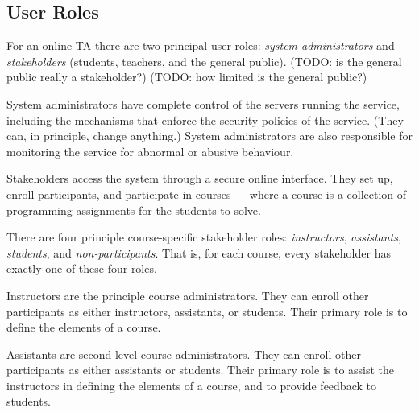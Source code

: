 
\subsection{User Roles}


For an online TA there are two principal user roles: \emph{system
administrators} and \emph{stakeholders} (students, teachers, and the general
public). (TODO: is the general public really a stakeholder?) (TODO: how limited
is the general public?)



System administrators have complete control of the servers running the service,
including the mechanisms that enforce the security policies of the service.
(They can, in principle, change anything.) System administrators are also
responsible for monitoring the service for abnormal or abusive behaviour.


Stakeholders access the system through a secure online interface. They set up,
enroll participants, and participate in courses --- where a course is a
collection of programming assignments for the students to solve.


There are four principle course-specific stakeholder roles: \emph{instructors},
\emph{assistants}, \emph{students}, and \emph{non-participants}. That is, for
each course, every stakeholder has exactly one of these four roles.

Instructors are the principle course administrators. They can enroll other
participants as either instructors, assistants, or students. Their primary role
is to define the elements of a course.

Assistants are second-level course administrators. They can enroll other
participants as either assistants or students. Their primary role is to assist
the instructors in defining the elements of a course, and to provide feedback
to students.

